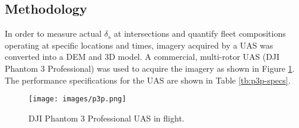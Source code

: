 \documentclass[preprint,12pt,a4paper]{elsarticle}
\begin{document}
\begin{linenumbers}
\begin{table}[H]
\centering
\caption[Vehicle density sample]{Sample of an iteration showing vehicle class and road space selection for speed = 5 km/h.}
\label{tb3:selection}
\end{table}

\section{Methodology}

In order to measure actual $\delta_{s}$ at intersections and quantify fleet compositions operating at specific locations and times, imagery acquired by a UAS was converted into a DEM and 3D model. A commercial, multi-rotor UAS (DJI Phantom 3 Professional) was used to acquire the imagery as shown in Figure \ref{fig:p3p}. The performance specifications for the UAS are shown in Table \ref{tb:p3p-specs}.

%
\begin{figure}[H]
\centering
\texttt{[image: images/p3p.png]}  %
\caption{DJI Phantom 3 Professional UAS in flight.}
\label{fig:p3p}
\end{figure}
%


\end{linenumbers}
\end{document}
